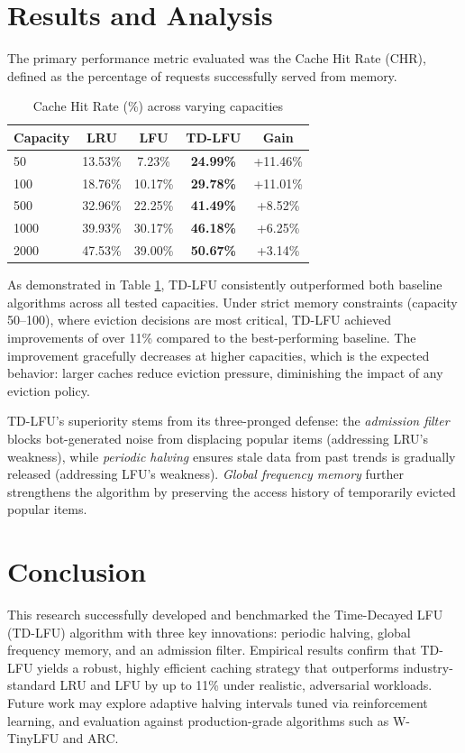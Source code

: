 \documentclass[conference]{IEEEtran}
\begin{document}
\section{Results and Analysis}
The primary performance metric evaluated was the Cache Hit Rate (CHR), defined as the percentage of requests successfully served from memory.

\begin{table}[htbp]
\caption{Cache Hit Rate (\%) across varying capacities}
\begin{center}
\begin{tabular}{lcccc}
\toprule
\textbf{Capacity} & \textbf{LRU} & \textbf{LFU} & \textbf{TD-LFU} & \textbf{Gain} \\
\midrule
50   & 13.53\% & 7.23\%  & \textbf{24.99\%} & +11.46\% \\
100  & 18.76\% & 10.17\% & \textbf{29.78\%} & +11.01\% \\
500  & 32.96\% & 22.25\% & \textbf{41.49\%} & +8.52\%  \\
1000 & 39.93\% & 30.17\% & \textbf{46.18\%} & +6.25\%  \\
2000 & 47.53\% & 39.00\% & \textbf{50.67\%} & +3.14\%  \\
\bottomrule
\end{tabular}
\label{tab:results}
\end{center}
\end{table}

As demonstrated in Table \ref{tab:results}, TD-LFU consistently outperformed both baseline algorithms across all tested capacities. Under strict memory constraints (capacity 50--100), where eviction decisions are most critical, TD-LFU achieved improvements of over 11\% compared to the best-performing baseline. The improvement gracefully decreases at higher capacities, which is the expected behavior: larger caches reduce eviction pressure, diminishing the impact of any eviction policy.

TD-LFU's superiority stems from its three-pronged defense: the \textit{admission filter} blocks bot-generated noise from displacing popular items (addressing LRU's weakness), while \textit{periodic halving} ensures stale data from past trends is gradually released (addressing LFU's weakness). \textit{Global frequency memory} further strengthens the algorithm by preserving the access history of temporarily evicted popular items.

\section{Conclusion}
This research successfully developed and benchmarked the Time-Decayed LFU (TD-LFU) algorithm with three key innovations: periodic halving, global frequency memory, and an admission filter. Empirical results confirm that TD-LFU yields a robust, highly efficient caching strategy that outperforms industry-standard LRU and LFU by up to 11\% under realistic, adversarial workloads. Future work may explore adaptive halving intervals tuned via reinforcement learning, and evaluation against production-grade algorithms such as W-TinyLFU and ARC.
\end{document}

